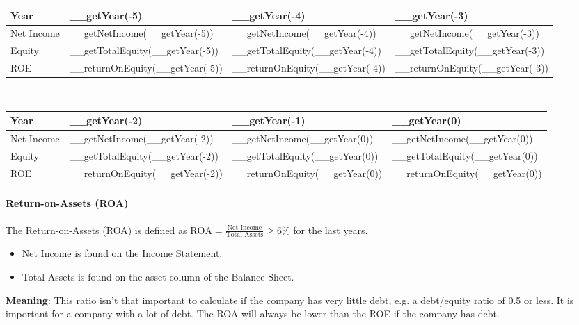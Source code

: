 \begin{tabularx}{\textwidth}{|X|X|X|X|}
 \hline
 Year                     & __getYear(-5)                   & __getYear(-4)                   & __getYear(-3)                   \\
 \hline
 Net Income               & __getNetIncome(__getYear(-5))   & __getNetIncome(__getYear(-4))   & __getNetIncome(__getYear(-3))   \\
 Equity                   & __getTotalEquity(__getYear(-5)) & __getTotalEquity(__getYear(-4)) & __getTotalEquity(__getYear(-3)) \\
 \rowcolor{lightgray} ROE & __returnOnEquity(__getYear(-5)) & __returnOnEquity(__getYear(-4)) & __returnOnEquity(__getYear(-3)) \\
 \hline
\end{tabularx}\\

\begin{tabularx}{\textwidth}{|X|X|X|X|}
 \hline
 Year                     & __getYear(-2)                   & __getYear(-1)                  & __getYear(0)                   \\
 \hline
 Net Income               & __getNetIncome(__getYear(-2))   & __getNetIncome(__getYear(0))   & __getNetIncome(__getYear(0))   \\
 Equity                   & __getTotalEquity(__getYear(-2)) & __getTotalEquity(__getYear(0)) & __getTotalEquity(__getYear(0)) \\
 \rowcolor{lightgray} ROE & __returnOnEquity(__getYear(-2)) & __returnOnEquity(__getYear(0)) & __returnOnEquity(__getYear(0)) \\
 \hline
\end{tabularx}

\paragraph{Return-on-Assets (ROA)}

The Return-on-Assets (ROA) is defined as
$\text{ROA} = \frac{\text{Net Income}}{\text{Total Assets}} \geq 6\%$ for the last years.
\begin{itemize}
    \item Net Income is found on the Income Statement.
    \item Total Assets is found on the asset column of the Balance Sheet.
\end{itemize}
\textbf{Meaning}: This ratio isn't that important to calculate if the company has very little debt, e.g.
a debt/equity ratio of 0.5 or less. It is important for a company with a lot of debt.
The ROA will always be lower than the ROE if the company has debt.\\

